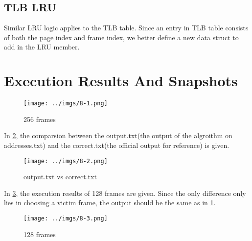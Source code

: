 \documentclass[12pt]{extarticle}
\newcommand{\<}{\langle}
\renewcommand{\>}{\rangle}
\theoremstyle{definition}
\begin{document}
	\subsection{TLB LRU}
	Similar LRU logic applies to the TLB table. Since an entry in TLB table consists of both the page index and frame index, we better define a new data struct to add in the LRU member.
	\section{Execution Results And Snapshots}
	\begin{figure}[H]
	\centering 
	\texttt{[image: ../imgs/8-1.png]}
	\caption{256 frames} 
	\label{fig1}
	\end{figure}
	In \ref{fig2}, the comparsion between the output.txt(the output of the algroithm on addresses.txt) and the correct.txt(the official output for reference) is given.
	\begin{figure}[H]
		\centering 
		\texttt{[image: ../imgs/8-2.png]}
		\caption{output.txt vs correct.txt} 
		\label{fig2}
	\end{figure}
	In \ref{fig3}, the execution results of 128 frames are given. Since the only difference only lies in choosing a victim frame, the output should be the same as in \ref{fig1}.
	\begin{figure}[H]
		\centering 
		\texttt{[image: ../imgs/8-3.png]}
		\caption{128 frames} 
		\label{fig3}
	\end{figure}
\end{document}
